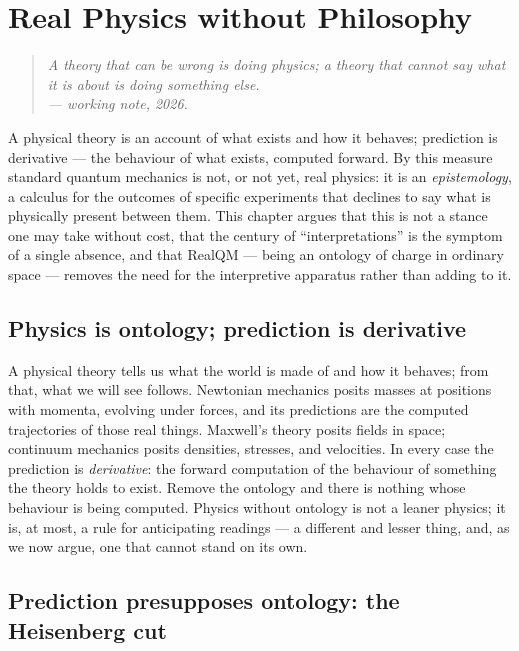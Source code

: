\chapter{Real Physics without Philosophy}\label{ch:philosophy}

\begin{quote}
\itshape A theory that can be wrong is doing physics; a theory that cannot say what it is about is doing something
else.\\
\normalfont\hfill --- working note, 2026.
\end{quote}
\bigskip

A physical theory is an account of what exists and how it behaves; prediction is derivative --- the behaviour of
what exists, computed forward. By this measure standard quantum mechanics is not, or not yet, real physics: it is
an \emph{epistemology}, a calculus for the outcomes of specific experiments that declines to say what is
physically present between them. This chapter argues that this is not a stance one may take without cost, that the
century of ``interpretations'' is the symptom of a single absence, and that RealQM --- being an ontology of charge
in ordinary space --- removes the need for the interpretive apparatus rather than adding to it.

\section{Physics is ontology; prediction is derivative}\label{sec:physics-ontology}

A physical theory tells us what the world is made of and how it behaves; from that, what we will see follows.
Newtonian mechanics posits masses at positions with momenta, evolving under forces, and its predictions are the
computed trajectories of those real things. Maxwell's theory posits fields in space; continuum mechanics posits
densities, stresses, and velocities. In every case the prediction is \emph{derivative}: the forward computation
of the behaviour of something the theory holds to exist. Remove the ontology and there is nothing whose
behaviour is being computed. Physics without ontology is not a leaner physics; it is, at most, a rule for
anticipating readings --- a different and lesser thing, and, as we now argue, one that cannot stand on its own.

\section{Prediction presupposes ontology: the Heisenberg cut}\label{sec:heisenberg-cut}

